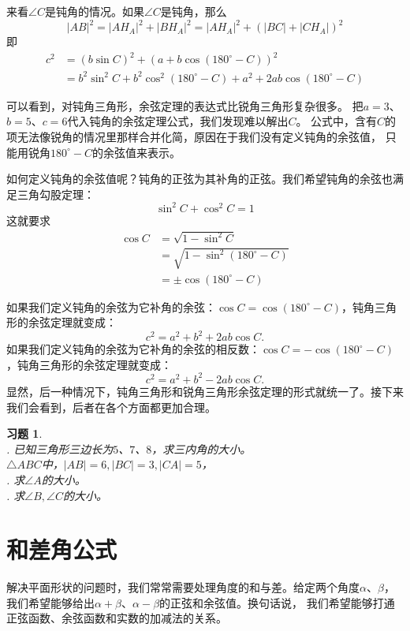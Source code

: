 \documentclass[12pt,UTF8]{ctexbook}
\newtheorem{xt}{习题}[section]
\begin{document}
来看$\angle C$是钝角的情况。如果$\angle C$是钝角，那么
$$ |AB|^2 = |AH_A|^2 + |BH_A|^2 = |AH_A|^2 + (|BC| + |CH_A|)^2$$
即
\begin{align*}
    c^2 &= (b\sin C)^2 + (a + b\cos (180^\circ - C))^2  \\
    &= b^2\sin^2 C + b^2\cos^2 (180^\circ - C) + a^2 + 2ab\cos (180^\circ - C) 
\end{align*}

可以看到，对钝角三角形，余弦定理的表达式比锐角三角形复杂很多。
把$a=3$、$b=5$、$c=6$代入钝角的余弦定理公式，我们发现难以解出$C$。
公式中，含有$C$的项无法像锐角的情况里那样合并化简，原因在于我们没有定义钝角的余弦值，
只能用锐角$180^\circ - C$的余弦值来表示。

如何定义钝角的余弦值呢？钝角的正弦为其补角的正弦。我们希望钝角的余弦也满足三角勾股定理：
$$ \sin^2 C +  \cos^2 C = 1 $$
这就要求
\begin{align*}
    \cos C &= \sqrt{1 - \sin^2 C}  \\
    &= \sqrt{1 - \sin^2 (180^\circ - C)}  \\
    &= \pm\cos (180^\circ - C) 
\end{align*}

如果我们定义钝角的余弦为它补角的余弦：$ \cos C = \cos (180^\circ - C)$，钝角三角形的余弦定理就变成：
$$ c^2 = a^2 + b^2 + 2ab \cos C.$$
如果我们定义钝角的余弦为它补角的余弦的相反数：$ \cos C = -\cos (180^\circ - C)$，钝角三角形的余弦定理就变成：
$$ c^2 = a^2 + b^2 - 2ab \cos C.$$
显然，后一种情况下，钝角三角形和锐角三角形余弦定理的形式就统一了。接下来我们会看到，后者在各个方面都更加合理。

\begin{xt}
    \mbox{}\\
    . 已知三角形三边长为$5$、$7$、$8$，求三内角的大小。\\
    $\triangle ABC$中，$|AB|=6,|BC|=3,|CA|=5$，\\
    . 求$\angle A$的大小。\\
    . 求$\angle B, \angle C$的大小。
\end{xt}

\section{和差角公式}

解决平面形状的问题时，我们常常需要处理角度的和与差。给定两个角度$\alpha$、$\beta$，
我们希望能够给出$\alpha + \beta$、$\alpha - \beta$的正弦和余弦值。换句话说，
我们希望能够打通正弦函数、余弦函数和实数的加减法的关系。
\end{document}
